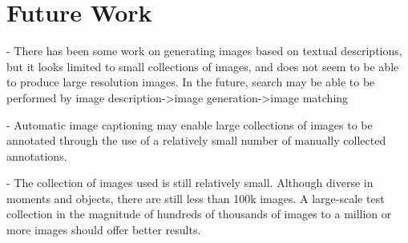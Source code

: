 \section{Future Work}



 - There has been some work on generating images based on textual descriptions, but it looks limited to small collections of images, and does not seem to be able to produce large resolution images. In the future, search may be able to be performed by image description->image generation->image matching 
 
 - Automatic image captioning may enable large collections of images to be annotated through the use of a relatively small number of manually collected annotations. 
 
 - The collection of images used is still relatively small. Although diverse in moments and objects, there are still less than 100k images. A large-scale test collection in the magnitude of hundreds of thousands of images to a million or more images should offer better results. 
